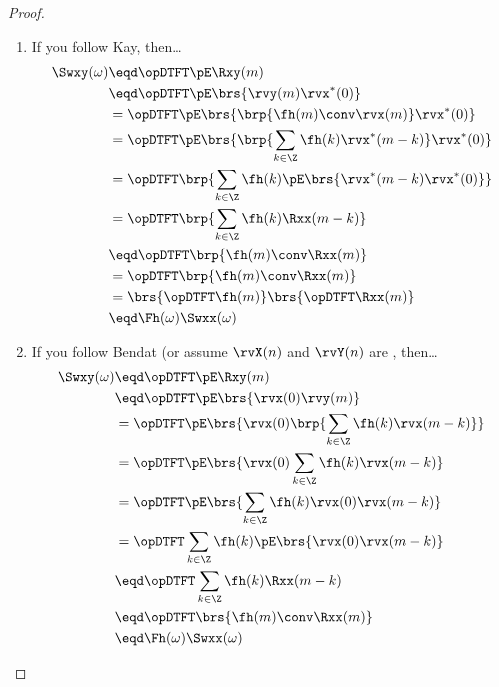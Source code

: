 \begin{proof}
\begin{enumerate}
\item If you follow Kay, then\ldots
  \begin{align*}
    \Swxy(\omega)
      &\eqd \opDTFT\pE\Rxy(m)
    \\&\eqd \opDTFT\pE\brs{\rvy(m)                                 \rvx^\ast(0)}
    \\&=    \opDTFT\pE\brs{\brp{\fh(m)\conv\rvx(m)}                \rvx^\ast(0)}
    \\&=    \opDTFT\pE\brs{\brp{\sum_{k\in\Z} \fh(k)\rvx^\ast(m-k)}\rvx^\ast(0)}
    \\&=    \opDTFT\brp{\sum_{k\in\Z} \fh(k)\pE\brs{\rvx^\ast(m-k)\rvx^\ast(0)}}
    \\&=    \opDTFT\brp{\sum_{k\in\Z} \fh(k)\Rxx(m-k)}
    \\&\eqd \opDTFT\brp{\fh(m)\conv\Rxx(m)}
    \\&=    \opDTFT\brp{\fh(m)\conv\Rxx(m)}
    \\&=    \brs{\opDTFT\fh(m)} \brs{\opDTFT\Rxx(m)}
    \\&\eqd \Fh(\omega) \Swxx(\omega)
  \end{align*}

\item If you follow Bendat (or assume $\rvX(n)$ and $\rvY(n)$ are , then\ldots
  \begin{align*}
    \Swxy(\omega)
      &\eqd \opDTFT\pE\Rxy(m)
    \\&\eqd \opDTFT\pE\brs{\rvx(0)\rvy(m)}
    \\&=    \opDTFT\pE\brs{\rvx(0)\brp{\sum_{k\in\Z} \fh(k) \rvx(m-k)}}
    \\&=    \opDTFT\pE\brs{\rvx(0)     \sum_{k\in\Z} \fh(k) \rvx(m-k)}
    \\&=    \opDTFT\pE\brs{            \sum_{k\in\Z} \fh(k) \rvx(0)\rvx(m-k)}
    \\&=    \opDTFT                    \sum_{k\in\Z} \fh(k) \pE\brs{\rvx(0)\rvx(m-k)}
    \\&\eqd \opDTFT                    \sum_{k\in\Z} \fh(k) \Rxx(m-k)
    \\&\eqd \opDTFT                             \brs{\fh(m) \conv \Rxx(m)}
    \\&\eqd \Fh(\omega) \Swxx(\omega)
  \end{align*}


\end{enumerate}
\end{proof}
